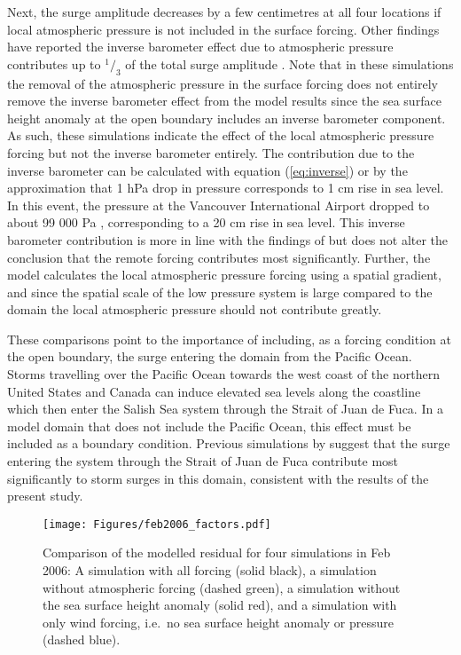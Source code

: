 \documentclass{tATO2e}
\begin{document}
Next, the surge amplitude decreases by a few centimetres at all four locations if local atmospheric pressure is not included in the surface forcing. Other findings have reported the inverse barometer effect due to atmospheric pressure contributes up to $^1/_3$ of the total surge amplitude \citep{murty1995storm}. Note that in these simulations the removal of the atmospheric pressure in the surface forcing does not entirely remove the inverse barometer effect from the model results since the sea surface height anomaly at the open boundary includes an inverse barometer component. As such, these simulations indicate the effect of the local atmospheric pressure forcing but not the inverse barometer entirely. The contribution due to the inverse barometer can be calculated with equation (\ref{eq:inverse}) or by the approximation that 1 hPa drop in pressure corresponds to 1 cm rise in sea level. In this event, the pressure at the Vancouver International Airport dropped to about 99 000 Pa \citep{ECClimateArchive}, corresponding to a 20 cm rise in sea level. This inverse barometer contribution is more in line with the findings of \citep{murty1995storm} but does not alter the conclusion that the remote forcing contributes most significantly. Further, the model calculates the local atmospheric pressure forcing using a spatial gradient, and since the spatial scale of the low pressure system is large compared to the domain the local atmospheric pressure should not contribute greatly. 

These comparisons point to the importance of including, as a forcing condition at the open boundary, the surge entering the domain from the Pacific Ocean. Storms travelling over the Pacific Ocean towards the west coast of the northern United States and Canada can induce elevated sea levels along the coastline which then enter the Salish Sea system through the Strait of Juan de Fuca. In a model domain that does not include the Pacific Ocean, this effect must be included as a boundary condition. Previous simulations by \citet{murty1995storm} suggest that the surge entering the system through the Strait of Juan de Fuca contribute most significantly to storm surges in this domain, consistent with the results of the present study.  

\begin{figure}
\centering
\texttt{[image: Figures/feb2006\_factors.pdf]}
\caption{Comparison of the modelled residual for four simulations in Feb 2006: A simulation with all forcing (solid black), a simulation without atmospheric forcing (dashed green), a simulation without the sea surface height anomaly (solid red), and a simulation with only wind forcing, i.e.\ no sea surface height anomaly or pressure (dashed blue). }
\label{fig:factors}
\end{figure}
\end{document}
